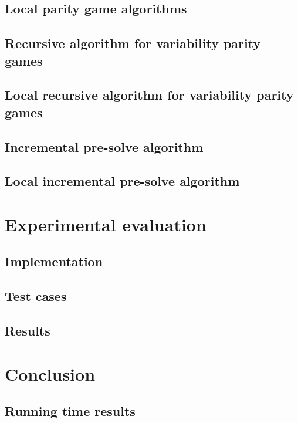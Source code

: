 \documentclass[]{article}
\begin{document}
\subsection{Local parity game algorithms}


\subsection{Recursive algorithm for variability parity games}


\subsection{Local recursive algorithm for variability parity games}


\subsection{Incremental pre-solve algorithm}


\subsection{Local incremental pre-solve algorithm}


\pagebreak
\section{Experimental evaluation}


\subsection{Implementation}


\subsection{Test cases}


\subsection{Results}


\pagebreak
\section{Conclusion}


\pagebreak
\begin{appendices}
\section{Running time results}
\label{appendix:resultsexact}

\end{appendices}

\pagebreak

 
\end{document}
